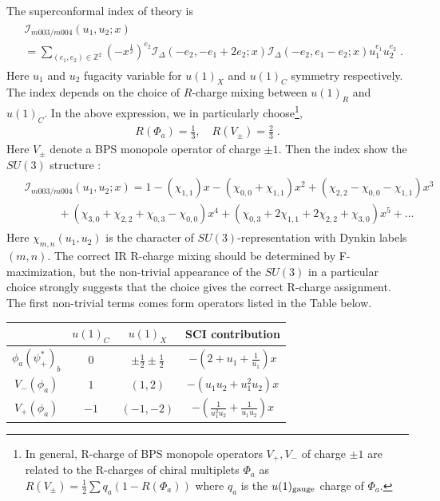 \documentclass[a4paper,11pt]{article}
\def\cI{\mathcal{I}}
\begin{document}
The superconformal index of theory is
%
\begin{align}
\begin{split}
&\cI_{m003/m004}(u_1,u_2;x) 
\\
&=\sum_{(e_1,e_2)\in \mathbb{Z}^2} (-x^{\frac{1}2})^{e_2}  \cI_{\Delta }(-e_2,-e_1+2e_2;x)\cI_{\Delta}(-e_2,e_1-e_2;x)  u_1^{e_1}u_2^{e_2}\;.
\end{split}
\end{align}
%
Here $u_1$ and $u_2$ fugacity variable for $u(1)_{X}$ and $u(1)_{C}$ symmetry respectively. The index  depends on  the  choice of $R$-charge mixing between $u(1)_R$ and $u(1)_C$. In the above expression, we in particularly choose\footnote{In general, R-charge of BPS monopole operators $V_+, V_-$ of charge $\pm 1$ are related to  the R-charges of chiral multiplets $\Phi_a$ as  $R(V_\pm ) = \frac{1}2\sum q_a  (1-R(\Phi_a))$ where $q_a$ is  the  $u(1)_{\rm gauge}$  charge of  $\Phi_a$.}, 
%
\begin{align}
R(\Phi_a) =\frac{1}3,\quad   R(V_\pm) = \frac{2}3\;.
\end{align}
%
Here  $V_\pm$ denote a BPS monopole operator of charge $\pm 1$.
Then the index show the  $SU(3)$ structure :
%
\begin{align}
\begin{split}
&\cI_{m003/m004}(u_1, u_2;x)  =1- (\chi_{1,1}) x-(\chi_{0,0}+\chi_{1,1}) x^2+(\chi_{2,2}-\chi_{0,0}-\chi_{1,1})x^3
\\
&\qquad \quad +(\chi_{3,0}+\chi_{2,2}+\chi_{0,3}-\chi_{0,0} )x^4+(\chi_{0,3}+2\chi_{1,1}+2 \chi_{2,2}+\chi_{3,0}) x^5+\ldots
\end{split}
\end{align}
%
Here $\chi_{m,n}(u_1, u_2)$ is the character of $SU(3)$-representation with Dynkin labels $(m,n)$. 
The correct IR R-charge mixing should be determined by F-maximization, but the non-trivial appearance of the $SU(3)$ in a particular choice strongly suggests that the choice gives the correct R-charge assignment. 
The first non-trivial terms comes form  operators listed in the Table below. 
%
\begin{table}[h!]
\centering
\label{leading operators in T[m003/m004]}
\begin{tabular}{|c | c | c | c | }
\hline
 & $u(1)_C$ & $u(1)_X$  & SCI contribution \\\hline
$\phi_a (\psi^*_+)_b$ & 0  & $\pm \frac{1}2 \pm \frac{1}2$   & $ -(2+u_1 + \frac{1}{u_1}) x$ \\\hline
$V_-  (\phi_a)$ & $1$ & $(1, 2)$ &    $- (u_1 u_2  + u_1^2 u_2) x $\\\hline
$V_+ (\phi_a )$ &$-1$& $(-1,-2)$ &  $- (\frac{1}{u_1^2 u_2} + \frac{1}{u_1 u_2})x$ \\
\hline 
\end{tabular}
\label{leading operators in T[m003/m004]}
\end{table}
\end{document}
